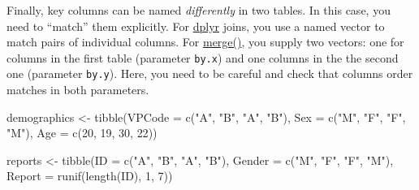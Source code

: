 \documentclass[
]{book}
\newenvironment{Shaded}{\begin{snugshade}}{\end{snugshade}}
\newcommand{\AttributeTok}[1]{\textcolor[rgb]{0.77,0.63,0.00}{#1}}
\newcommand{\DecValTok}[1]{\textcolor[rgb]{0.00,0.00,0.81}{#1}}
\newcommand{\FunctionTok}[1]{\textcolor[rgb]{0.00,0.00,0.00}{#1}}
\newcommand{\NormalTok}[1]{#1}
\newcommand{\OtherTok}[1]{\textcolor[rgb]{0.56,0.35,0.01}{#1}}
\newcommand{\StringTok}[1]{\textcolor[rgb]{0.31,0.60,0.02}{#1}}
\begin{document}
Finally, key columns can be named \emph{differently} in two tables. In this case, you need to ``match'' them explicitly. For \href{https://dplyr.tidyverse.org/reference/mutate-joins.html}{dplyr} joins, you use a named vector to match pairs of individual columns. For \href{https://stat.ethz.ch/R-manual/R-devel/library/base/html/merge.html}{merge()}, you supply two vectors: one for columns in the first table (parameter \texttt{by.x}) and one columns in the the second one (parameter \texttt{by.y}). Here, you need to be careful and check that columns order matches in both parameters.

\begin{Shaded}
\begin{Highlighting}[]
\NormalTok{demographics }\OtherTok{\textless{}{-}} \FunctionTok{tibble}\NormalTok{(}\AttributeTok{VPCode =} \FunctionTok{c}\NormalTok{(}\StringTok{"A"}\NormalTok{, }\StringTok{"B"}\NormalTok{, }\StringTok{"A"}\NormalTok{, }\StringTok{"B"}\NormalTok{),}
                       \AttributeTok{Sex =} \FunctionTok{c}\NormalTok{(}\StringTok{"M"}\NormalTok{, }\StringTok{"F"}\NormalTok{, }\StringTok{"F"}\NormalTok{, }\StringTok{"M"}\NormalTok{),}
                       \AttributeTok{Age =} \FunctionTok{c}\NormalTok{(}\DecValTok{20}\NormalTok{, }\DecValTok{19}\NormalTok{, }\DecValTok{30}\NormalTok{, }\DecValTok{22}\NormalTok{))}

\NormalTok{reports }\OtherTok{\textless{}{-}} \FunctionTok{tibble}\NormalTok{(}\AttributeTok{ID =} \FunctionTok{c}\NormalTok{(}\StringTok{"A"}\NormalTok{, }\StringTok{"B"}\NormalTok{, }\StringTok{"A"}\NormalTok{, }\StringTok{"B"}\NormalTok{),}
                  \AttributeTok{Gender =} \FunctionTok{c}\NormalTok{(}\StringTok{"M"}\NormalTok{, }\StringTok{"F"}\NormalTok{, }\StringTok{"F"}\NormalTok{, }\StringTok{"M"}\NormalTok{),}
                  \AttributeTok{Report =} \FunctionTok{runif}\NormalTok{(}\FunctionTok{length}\NormalTok{(ID), }\DecValTok{1}\NormalTok{, }\DecValTok{7}\NormalTok{))}
\end{Highlighting}
\end{Shaded}
\end{document}
